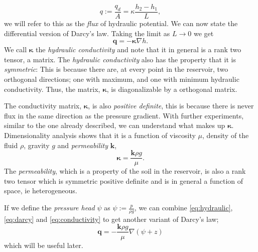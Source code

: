 \documentclass[../Main/main.tex]{subfiles}
\begin{document}
\begin{equation*}
q := \frac{q_d}{A} = \kappa \frac{h_2-h_1}{L},
\end{equation*}
we will refer to this as the \emph{flux} of hydraulic potential. We can now state the differential version of Darcy's law. Taking the limit as $L\rightarrow 0$ we get 
\begin{equation}\label{eq:darcy}
\bm{q} = -\bm{\kappa} \nabla h.
\end{equation}
We call $\bm{\kappa}$ the \emph{hydraulic conductivity} and note that it in general is a rank two tensor, a matrix. The \emph{hydraulic conductivity} also has the property that it is \emph{symmetric}: This is because there are, at every point in the reservoir, two orthogonal directions; one with maximum, and one with minimum hydraulic conductivity. Thus, the matrix, $\bm{\kappa}$, is diagonalizable by a orthogonal matrix.\par
The conductivity matrix, $\bm{\kappa}$, is also \emph{positive definite}, this is because there is never flux in the same direction as the pressure gradient. 
With further experiments, similar to the one already described, we can understand what makes up $\bm{\kappa}$. Dimensionality analysis shows that it is  a function of viscosity $\mu$, density of the fluid $\rho$, gravity $g$ and \emph{permeability} $\bm{k}$,
\begin{equation} \label{eq:conductivity}
\bm{\kappa} = \frac{\bm{k} \rho g}{\mu}.
\end{equation}
The \emph{permeability}, which is a property of the soil in the reservoir, is also a rank two tensor which is symmetric positive definite and is in general a function of space, ie heterogeneous.
\par If we define the \emph{pressure head} $\psi$ as $\psi := \frac{p}{\rho g}$, we can combine \eqref{eq:hydraulic}, \eqref{eq:darcy} and \eqref{eq:conductivity} to get another variant of Darcy's law;
\begin{equation}\label{eq:darcyv2}
\bm{q} = -\frac{\bm{k}\rho g}{\mu}\nabla(\psi + z)
\end{equation}
 which will be useful later.
\end{document}

